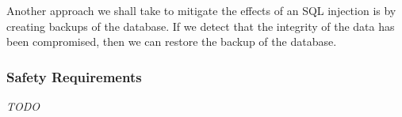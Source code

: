 \documentclass[fullpage]{article}
\begin{document}
Another approach we shall take to mitigate the effects of an SQL injection is by creating backups of the database. If we detect that the integrity of the data has been compromised, then we can restore the backup of the database.

\subsubsection*{Safety Requirements}
\emph{TODO}

\begin{comment}
\begin{thebibliography}{9}

\bibitem{website}
S. Liu, “Canada most popular desktop browsers 2021,” Statista, 04-Oct-2021. [Online]. Available: https://www.statista.com/statistics/499462/most-popular-desktop-browsers-in-canada-by-market-share/. [Accessed: 17-Oct-2021].

\end{thebibliography}
\end{comment}
\end{document}
